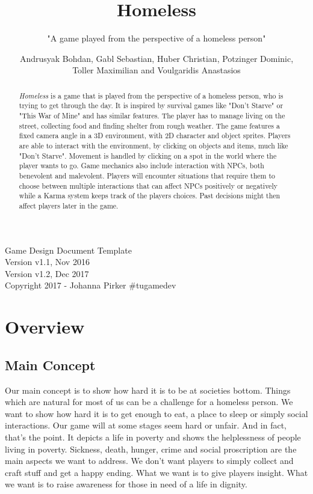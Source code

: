 \documentclass[a4paper]{scrreprt}
\title{Homeless}
\subtitle{"A game played from the perspective of a homeless person"}
\author{Andrusyak Bohdan, Gabl Sebastian, Huber Christian, Potzinger Dominic,\\Toller Maximilian and Voulgaridis Anastasios}
\begin{document}
\maketitle

\null\vfill
\noindent
Game Design Document Template\\ 
Version v1.1, Nov 2016\\
Version v1.2, Dec 2017\\
Copyright 2017 - Johanna Pirker \#tugamedev\\
\newpage
\begin{abstract}
\textit{Homeless} is a game that is played from the perspective of a homeless person, who is trying to get through the day. It is inspired by survival games like "Don’t Starve" or "This War of Mine" and has similar features. The player has to manage living on the street, collecting food and finding shelter from rough weather. The game features a fixed camera angle in a 3D environment, with 2D character and object sprites. Players are able to interact with the environment, by clicking on objects and items, much like "Don’t Starve". Movement is handled by clicking on a spot in the world where the player wants to go. Game mechanics also include interaction with NPCs, both benevolent and malevolent. Players will encounter situations that require them to choose between multiple interactions that can affect NPCs positively or negatively while a Karma system keeps track of the players choices. Past decisions might then affect players later in the game.
\end{abstract}

\tableofcontents

\chapter{Overview}



\section{Main Concept}
Our main concept is to show how hard it is to be at societies bottom. Things which are natural for most of us can be a challenge for a homeless person. We want to show how hard it is to get enough to eat, a place to sleep or simply social interactions. Our game will at some stages seem hard or unfair. And in fact, that's the point. It depicts a life in poverty and shows the helplessness of people living in poverty. Sickness, death, hunger, crime and social proscription are the main aspects we want to address. We don't want players to simply collect and craft stuff and get a happy ending. What we want is to give players insight. What we want is to raise awareness for those in need of a life in dignity.
\end{document}
